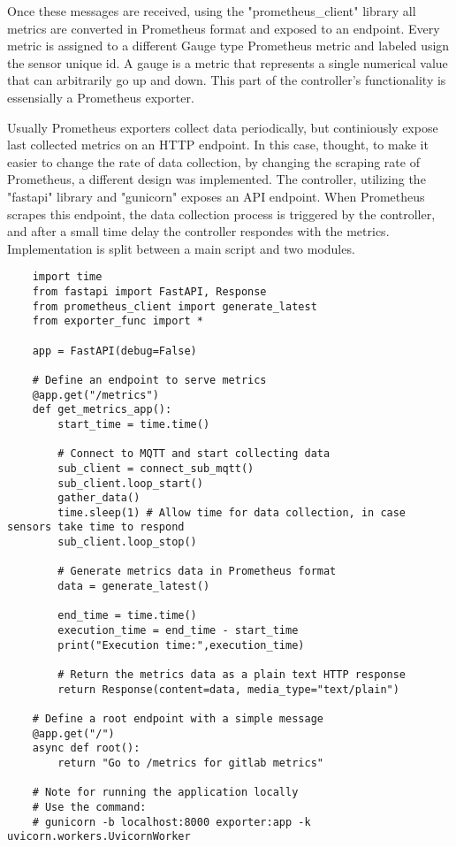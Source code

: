 Once these messages are received, using the "prometheus\_client" library all metrics are converted in Prometheus format and exposed to an endpoint. Every metric is assigned to a different Gauge type Prometheus metric and labeled usign the sensor unique id. A gauge is a metric that represents a single numerical value that can arbitrarily go up and down. This part of the controller's functionality is essensially a Prometheus exporter.

Usually Prometheus exporters collect data periodically, but continiously expose last collected metrics on an HTTP endpoint. In this case, thought, to make it easier to change the rate of data collection, by changing the scraping rate of Prometheus, a different design was implemented. The controller, utilizing the "fastapi" library and "gunicorn" exposes an API endpoint. When Prometheus scrapes this endpoint, the data collection process is triggered by the controller, and after a small time delay the controller respondes with the metrics. Implementation is split between a main script and two modules.

\begin{verbatim}
    import time
    from fastapi import FastAPI, Response
    from prometheus_client import generate_latest
    from exporter_func import *

    app = FastAPI(debug=False)

    # Define an endpoint to serve metrics
    @app.get("/metrics")
    def get_metrics_app():
        start_time = time.time()
        
        # Connect to MQTT and start collecting data
        sub_client = connect_sub_mqtt()
        sub_client.loop_start()
        gather_data()
        time.sleep(1) # Allow time for data collection, in case sensors take time to respond
        sub_client.loop_stop()

        # Generate metrics data in Prometheus format
        data = generate_latest()

        end_time = time.time()
        execution_time = end_time - start_time
        print("Execution time:",execution_time)

        # Return the metrics data as a plain text HTTP response
        return Response(content=data, media_type="text/plain")

    # Define a root endpoint with a simple message
    @app.get("/")
    async def root():
        return "Go to /metrics for gitlab metrics"

    # Note for running the application locally
    # Use the command:
    # gunicorn -b localhost:8000 exporter:app -k uvicorn.workers.UvicornWorker
\end{verbatim}

